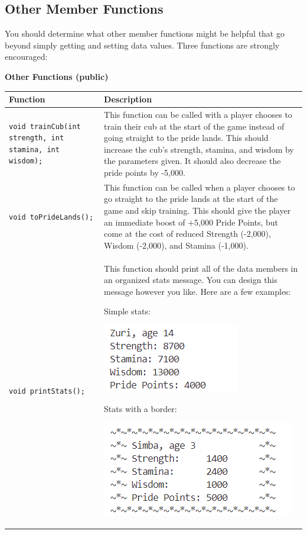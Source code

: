 \subsection{Other Member Functions}

You should determine what other member functions might be helpful that go beyond simply getting and setting data values. Three functions are strongly encouraged:

\textbf{Other Functions (public)}

\renewcommand{\arraystretch}{1.5} 
\begin{longtable}{|p{2.0in}|p{4.0in}|}
\hline
\textbf{Function} & \textbf{Description} \\ \hline
\begin{verbatim}
void trainCub(int strength, int stamina, int wisdom);
\end{verbatim} 
& This function can be called with a player chooses to train their cub at the start of the game instead of going straight to the pride lands. This should increase the cub's strength, stamina, and wisdom by the parameters given. It should also decrease the pride points by -5,000. \\ \hline
\texttt{void toPrideLands();} & This function can be called when a player chooses to go straight to the pride lands at the start of the game and skip training. This should give the player an immediate boost of +5,000 Pride Points, but come at the cost of reduced Strength (-2,000), Wisdom (-2,000), and Stamina (-1,000). \\ \hline
\texttt{void printStats();} & This function should print all of the data members in an organized stats message. You can design this message however you like. Here are a few examples:

\begin{example}
Simple stats:

\includegraphics[]{images/project2/PrintStats1.png}
\end{example}

\begin{example}
Stats with a border:

\includegraphics[]{images/project2/PrintStats2.png}
\end{example}


\end{longtable}
